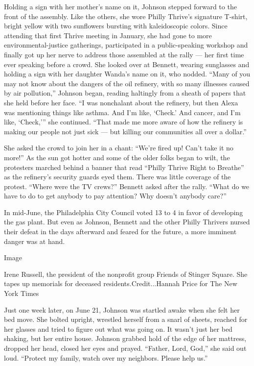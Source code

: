 Holding a sign with her mother's name on it, Johnson stepped forward to
the front of the assembly. Like the others, she wore Philly Thrive's
signature T-shirt, bright yellow with two sunflowers bursting with
kaleidoscopic colors. Since attending that first Thrive meeting in
January, she had gone to more environmental-justice gatherings,
participated in a public-speaking workshop and finally got up her nerve
to address those assembled at the rally --- her first time ever speaking
before a crowd. She looked over at Bennett, wearing sunglasses and
holding a sign with her daughter Wanda's name on it, who nodded. ``Many
of you may not know about the dangers of the oil refinery, with so many
illnesses caused by air pollution,'' Johnson began, reading haltingly
from a sheath of papers that she held before her face. ``I was
nonchalant about the refinery, but then Alexa was mentioning things like
asthma. And I'm like, `Check.' And cancer, and I'm like, `Check,''' she
continued. ``That made me more aware of how the refinery is making our
people not just sick --- but killing our communities all over a
dollar.''

She asked the crowd to join her in a chant: ``We're fired up! Can't take
it no more!'' As the sun got hotter and some of the older folks began to
wilt, the protesters marched behind a banner that read ``Philly Thrive
Right to Breathe'' as the refinery's security guards eyed them. There
was little coverage of the protest. ``Where were the TV crews?'' Bennett
asked after the rally. ``What do we have to do to get anybody to pay
attention? Why doesn't anybody care?''

In mid-June, the Philadelphia City Council voted 13 to 4 in favor of
developing the gas plant. But even as Johnson, Bennett and the other
Philly Thrivers nursed their defeat in the days afterward and feared for
the future, a more imminent danger was at hand.

Image

Irene Russell, the president of the nonprofit group Friends of Stinger
Square. She tapes up memorials for deceased residents.Credit...Hannah
Price for The New York Times

Just one week later, on June 21, Johnson was startled awake when she
felt her bed move. She bolted upright, wrestled herself from a snarl of
sheets, reached for her glasses and tried to figure out what was going
on. It wasn't just her bed shaking, but her entire house. Johnson
grabbed hold of the edge of her mattress, dropped her head, closed her
eyes and prayed. ``Father, Lord, God,'' she said out loud. ``Protect my
family, watch over my neighbors. Please help us.''

